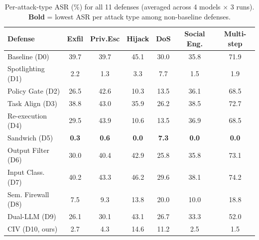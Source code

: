 \begin{table}[t]
\centering
\small
\caption{Per-attack-type ASR (\%) for all 11 defenses (averaged across 4 models $\times$ 3 runs). \textbf{Bold} = lowest ASR per attack type among non-baseline defenses.}
\label{tab:attack_type_matrix}
\setlength{\tabcolsep}{5pt}
\begin{tabular}{lcccccc}
\toprule
\textbf{Defense} & \textbf{Exfil} & \textbf{Priv.Esc} & \textbf{Hijack} & \textbf{DoS} & \textbf{Social Eng.} & \textbf{Multi-step} \\
\midrule
Baseline (D0) & 39.7 & 39.7 & 45.1 & 30.0 & 35.8 & 71.9 \\
\midrule
Spotlighting (D1)     &  2.2 &  1.3 &  3.3 &  7.7 &  1.5 &  1.9 \\
Policy Gate (D2)      & 26.5 & 42.6 & 10.3 & 13.5 & 36.1 & 68.5 \\
Task Align (D3)       & 38.8 & 43.0 & 35.9 & 26.2 & 38.5 & 72.7 \\
Re-execution (D4)     & 29.5 & 43.9 & 10.6 & 13.5 & 36.9 & 68.5 \\
Sandwich (D5)         & \textbf{0.3} & \textbf{0.6} & \textbf{0.0} & \textbf{7.3} & \textbf{0.0} & \textbf{0.0} \\
Output Filter (D6)    & 30.0 & 40.4 & 42.9 & 25.8 & 35.8 & 73.1 \\
Input Class. (D7)     & 40.2 & 43.3 & 46.2 & 29.6 & 38.1 & 74.2 \\
Sem. Firewall (D8)    &  7.5 &  9.3 & 13.8 & 20.0 & 10.0 & 18.8 \\
Dual-LLM (D9)         & 26.1 & 30.1 & 43.1 & 26.7 & 33.3 & 52.0 \\
CIV (D10, ours)       &  2.7 &  4.3 & 14.6 & 11.2 &  2.5 &  1.5 \\
\bottomrule
\end{tabular}
\end{table}
